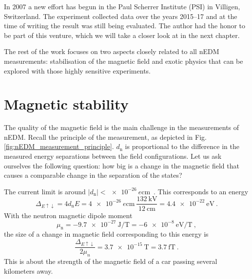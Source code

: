 In 2007 a new effort has begun in the Paul Scherrer Institute (PSI) in Villigen, Switzerland. The experiment collected data over the years 2015--17 and at the time of writing the result was still being evaluated. The author had the honor to be part of this venture, which we will take a closer look at in the next chapter.

The rest of the work focuses on two aspects closely related to all nEDM measurements: stabilisation of the magnetic field and exotic physics that can be explored with those highly sensitive experiments.



\section{Magnetic stability}
The quality of the magnetic field is the main challenge in the measurements of nEDM. Recall the principle of the measurement, as depicted in Fig.\,\ref{fig:nEDM_measurement_principle}. $d_\text{n}$ is proportional to the difference in the measured energy separations between the field configurations. Let us ask ourselves the following question: how big is a change in the magnetic field that causes a comparable change in the separation of the states?

The current limit is around $|d_\text{n}| < \SI{e-26}{\elementarycharge\centi\meter}$~\cite{PhysRevLett.97.131801}. This corresponds to an energy
\begin{equation}
  \Delta_{E\uparrow\downarrow} = 4 d_\text{n} E = \SI{4e-26}{\elementarycharge\centi\meter} \ \frac{ \SI{132}{\kilo\volt} }{ \SI{12}{\centi\meter} } = \SI{4.4e-22}{\electronvolt} \ .
\end{equation}
With the neutron magnetic dipole moment
\begin{equation}
  \mu_\text{n} = \SI{-9.7e-27}{\joule\per\tesla} = \SI{-6e-8}{\electronvolt\per\tesla} \ ,
\end{equation}
the size of a change in magnetic field corresponding to this energy is
\begin{equation}
  \frac{ \Delta_{E\uparrow\downarrow} }{2 \mu_n} = \SI{3.7e-15}{\tesla} = \SI{3.7}{\femto\tesla} \ .
\end{equation}
This is about the strength of the magnetic field of a car passing several kilometers away. 


